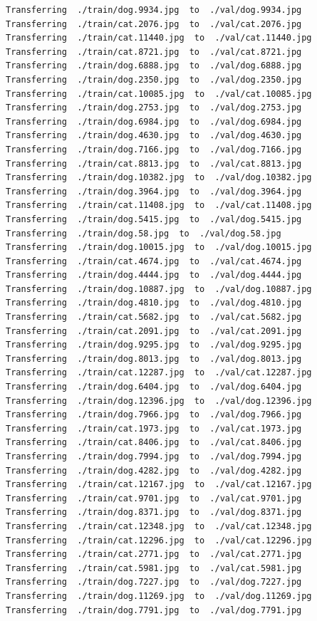 \documentclass[]{book}
\theoremstyle{definition}
\theoremstyle{definition}
\theoremstyle{definition}
\theoremstyle{remark}
\begin{document}
\begin{verbatim}
Transferring  ./train/dog.9934.jpg  to  ./val/dog.9934.jpg
Transferring  ./train/cat.2076.jpg  to  ./val/cat.2076.jpg
Transferring  ./train/cat.11440.jpg  to  ./val/cat.11440.jpg
Transferring  ./train/cat.8721.jpg  to  ./val/cat.8721.jpg
Transferring  ./train/dog.6888.jpg  to  ./val/dog.6888.jpg
Transferring  ./train/dog.2350.jpg  to  ./val/dog.2350.jpg
Transferring  ./train/cat.10085.jpg  to  ./val/cat.10085.jpg
Transferring  ./train/dog.2753.jpg  to  ./val/dog.2753.jpg
Transferring  ./train/dog.6984.jpg  to  ./val/dog.6984.jpg
Transferring  ./train/dog.4630.jpg  to  ./val/dog.4630.jpg
Transferring  ./train/dog.7166.jpg  to  ./val/dog.7166.jpg
Transferring  ./train/cat.8813.jpg  to  ./val/cat.8813.jpg
Transferring  ./train/dog.10382.jpg  to  ./val/dog.10382.jpg
Transferring  ./train/dog.3964.jpg  to  ./val/dog.3964.jpg
Transferring  ./train/cat.11408.jpg  to  ./val/cat.11408.jpg
Transferring  ./train/dog.5415.jpg  to  ./val/dog.5415.jpg
Transferring  ./train/dog.58.jpg  to  ./val/dog.58.jpg
Transferring  ./train/dog.10015.jpg  to  ./val/dog.10015.jpg
Transferring  ./train/cat.4674.jpg  to  ./val/cat.4674.jpg
Transferring  ./train/dog.4444.jpg  to  ./val/dog.4444.jpg
Transferring  ./train/dog.10887.jpg  to  ./val/dog.10887.jpg
Transferring  ./train/dog.4810.jpg  to  ./val/dog.4810.jpg
Transferring  ./train/cat.5682.jpg  to  ./val/cat.5682.jpg
Transferring  ./train/cat.2091.jpg  to  ./val/cat.2091.jpg
Transferring  ./train/dog.9295.jpg  to  ./val/dog.9295.jpg
Transferring  ./train/dog.8013.jpg  to  ./val/dog.8013.jpg
Transferring  ./train/cat.12287.jpg  to  ./val/cat.12287.jpg
Transferring  ./train/dog.6404.jpg  to  ./val/dog.6404.jpg
Transferring  ./train/dog.12396.jpg  to  ./val/dog.12396.jpg
Transferring  ./train/dog.7966.jpg  to  ./val/dog.7966.jpg
Transferring  ./train/cat.1973.jpg  to  ./val/cat.1973.jpg
Transferring  ./train/cat.8406.jpg  to  ./val/cat.8406.jpg
Transferring  ./train/dog.7994.jpg  to  ./val/dog.7994.jpg
Transferring  ./train/dog.4282.jpg  to  ./val/dog.4282.jpg
Transferring  ./train/cat.12167.jpg  to  ./val/cat.12167.jpg
Transferring  ./train/cat.9701.jpg  to  ./val/cat.9701.jpg
Transferring  ./train/dog.8371.jpg  to  ./val/dog.8371.jpg
Transferring  ./train/cat.12348.jpg  to  ./val/cat.12348.jpg
Transferring  ./train/cat.12296.jpg  to  ./val/cat.12296.jpg
Transferring  ./train/cat.2771.jpg  to  ./val/cat.2771.jpg
Transferring  ./train/cat.5981.jpg  to  ./val/cat.5981.jpg
Transferring  ./train/dog.7227.jpg  to  ./val/dog.7227.jpg
Transferring  ./train/dog.11269.jpg  to  ./val/dog.11269.jpg
Transferring  ./train/dog.7791.jpg  to  ./val/dog.7791.jpg

\end{verbatim}
\end{document}
